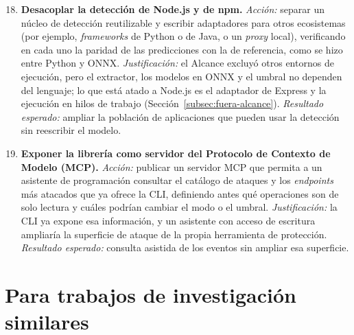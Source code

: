 \begin{enumerate}
    \setcounter{enumi}{17}
    \item \textbf{Desacoplar la detección de Node.js y de npm.} \textit{Acción:} separar un
    núcleo de detección reutilizable y escribir adaptadores para otros ecosistemas (por ejemplo,
    \textit{frameworks} de Python o de Java, o un \textit{proxy} local), verificando en cada uno la
    paridad de las predicciones con la de referencia, como se hizo entre Python y ONNX.
    \textit{Justificación:} el Alcance excluyó otros entornos de ejecución, pero el extractor, los
    modelos en ONNX y el umbral no dependen del lenguaje; lo que está atado a Node.js es el
    adaptador de Express y la ejecución en hilos de trabajo (Sección~\ref{subsec:fuera-alcance}).
    \textit{Resultado esperado:} ampliar la población de aplicaciones que pueden usar la detección
    sin reescribir el modelo.

    \item \textbf{Exponer la librería como servidor del Protocolo de Contexto de Modelo (MCP).}
    \textit{Acción:} publicar un servidor MCP que permita a un asistente de programación consultar
    el catálogo de ataques y los \textit{endpoints} más atacados que ya ofrece la CLI, definiendo
    antes qué operaciones son de solo lectura y cuáles podrían cambiar el modo o el umbral.
    \textit{Justificación:} la CLI ya expone esa información, y un asistente con acceso de
    escritura ampliaría la superficie de ataque de la propia herramienta de protección.
    \textit{Resultado esperado:} consulta asistida de los eventos sin ampliar esa superficie.
\end{enumerate}

\section{Para trabajos de investigación similares}

